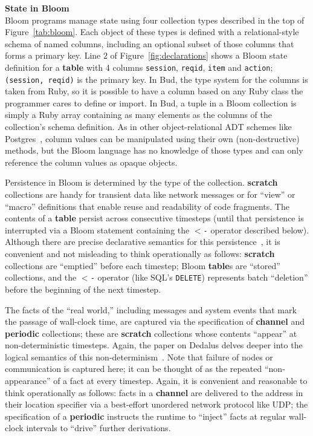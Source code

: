 \noindent\textbf{State in Bloom}\\
\noindent
Bloom programs manage state using four collection types described in the top of Figure~\ref{tab:bloom}. Each object of these types is defined with a relational-style schema of named columns, including an optional subset of those columns that forms a primary key.  Line 2 of Figure~\ref{fig:declarations} shows a Bloom state definition for a \textbf{table} with 4 columns \texttt{session}, \texttt{reqid}, \texttt{item} and \texttt{action}; \texttt{(session, reqid)} is the primary key. In Bud, the type system for the columns is taken from Ruby, so it is possible to have a column based on any Ruby class the programmer cares to define or import.  In Bud, a tuple in a Bloom collection is simply a Ruby array containing as many elements as the columns of the collection's schema definition.  As in other object-relational ADT schemes like Postgres~\cite{postgres-adt}, column values can be manipulated using their own (non-destructive) methods, but the Bloom language has no knowledge of those types and can only reference the column values as opaque objects.  

Persistence in Bloom is determined by the type of the collection.  \textbf{scratch} collections are handy for transient data like network messages or for ``view'' or ``macro'' definitions that enable reuse and readability of code fragments.  The contents of a \textbf{table} persist across consecutive timesteps (until that persistence is interrupted via a Bloom statement containing the \texttt{$<$-} operator described below). Although there are precise declarative semantics for this persistence~\cite{dedalus-techr}, it is convenient and not misleading to think operationally as follows: \textbf{scratch} collections are ``emptied'' before each timestep; Bloom \textbf{table}s are ``stored'' collections, and the \texttt{$<$-} operator (like SQL's \texttt{DELETE}) represents batch ``deletion'' before the beginning of the next timestep.

The facts of the ``real world,'' including messages and system events that mark the passage of wall-clock time, are captured via the specification of \textbf{channel} and \textbf{periodic} collections; these are \textbf{scratch} collections whose contents ``appear'' at non-deterministic timesteps. 
Again, the paper on Dedalus delves deeper into the logical semantics of this non-determinism~\cite{dedalus-techr}.  Note that failure of nodes or communication is captured here; it can be thought of as the repeated ``non-appearance'' of a fact at every timestep.  Again, it is convenient and reasonable to think operationally as follows: facts in a \textbf{channel} are delivered to the address in their location specifier via a best-effort unordered network protocol like UDP; the specification of a \textbf{periodic} instructs the runtime to ``inject'' facts at regular wall-clock intervals to ``drive'' further derivations.

